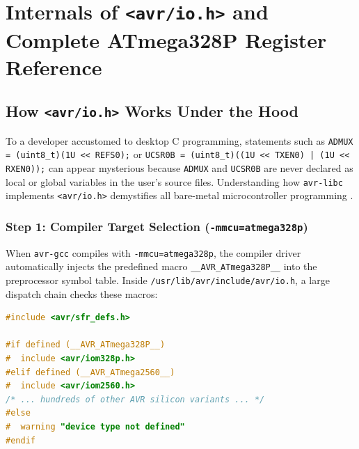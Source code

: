 \documentclass[11pt,a4paper,oneside]{report}
\begin{document}
\chapter{Internals of \texttt{<avr/io.h>} and Complete ATmega328P Register Reference}

\section{How \texttt{<avr/io.h>} Works Under the Hood}

To a developer accustomed to desktop C programming, statements such as \texttt{ADMUX = (uint8\_t)(1U << REFS0);} or \texttt{UCSR0B = (uint8\_t)((1U << TXEN0) | (1U << RXEN0));} can appear mysterious because \texttt{ADMUX} and \texttt{UCSR0B} are never declared as local or global variables in the user's source files. Understanding how \texttt{avr-libc} implements \texttt{<avr/io.h>} demystifies all bare-metal microcontroller programming \cite{avr_libc_io,avr_libc_sfr}.

\subsection{Step 1: Compiler Target Selection (\texttt{-mmcu=atmega328p})}
When \texttt{avr-gcc} compiles with \texttt{-mmcu=atmega328p}, the compiler driver automatically injects the predefined macro \texttt{\_\_AVR\_ATmega328P\_\_} into the preprocessor symbol table. Inside \texttt{/usr/lib/avr/include/avr/io.h}, a large dispatch chain checks these macros:

\begin{lstlisting}[language=C,caption={Simplified internal dispatch mechanism inside \texttt{<avr/io.h>} (\texttt{avr-libc}).}]
#include <avr/sfr_defs.h>

#if defined (__AVR_ATmega328P__)
#  include <avr/iom328p.h>
#elif defined (__AVR_ATmega2560__)
#  include <avr/iom2560.h>
/* ... hundreds of other AVR silicon variants ... */
#else
#  warning "device type not defined"
#endif
\end{lstlisting}
\end{document}
